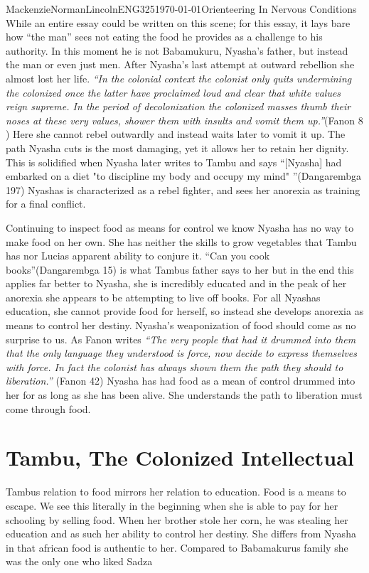 \documentclass{article}
\begin{document}
\begin{mla}{Mackenzie}{Norman}{Lincoln}{ENG325}{\today}{Orienteering In Nervous Conditions}
While an entire essay could be written on this scene; for this essay, it lays bare how ``the man'' sees not eating the food he provides as a challenge to his authority. In this moment he is not Babamukuru, Nyasha's father, but instead the man or even just men. After Nyasha's last attempt at outward rebellion she almost lost her life. \textit{``In the colonial context the colonist only quits undermining the colonized once the latter have proclaimed loud and clear that white values reign supreme. In the period of decolonization the colonized masses thumb their noses at these very values, shower them with insults and vomit them up.''}(Fanon 8 ) Here she cannot rebel outwardly and instead waits later to vomit it up. The path Nyasha cuts is the most damaging, yet it allows her to retain her dignity. This is solidified when Nyasha later writes to Tambu and says ``[Nyasha] had embarked on a diet "to discipline my body and occupy my mind" ''(Dangarembga 197) Nyashas is characterized as a rebel fighter, and sees her anorexia as training for a final conflict. 

Continuing to inspect food as means for control we know Nyasha has no way to make food on her own. She has neither the skills to grow vegetables that Tambu has nor Lucias apparent ability to conjure it. ``Can you cook books''(Dangarembga 15) is what Tambus father says to her but in the end this applies far better to Nyasha, she is incredibly educated and in the peak of her anorexia she appears to be attempting to live off books. For all Nyashas education, she cannot provide food for herself, so instead she develops anorexia as means to control her destiny. Nyasha's weaponization of food should come as no surprise to us. As Fanon writes \textit{``The very people that had it drummed into them that the only language they understood is force, now decide to express themselves with force. In fact the colonist has always shown them the path they should to liberation.''} (Fanon 42) Nyasha has had food as a mean of control drummed into her for as long as she has been alive. She understands the path to liberation must come through food. 


\section*{ Tambu, The Colonized Intellectual}
Tambus relation to food mirrors her relation to education. Food is a means to escape. We see this literally in the beginning when she is able to pay for her schooling by selling food. When her brother stole her corn, he was stealing her education and as such her ability to control her destiny. She differs from Nyasha in that african food is authentic to her. Compared to Babamakurus family she was the only one who liked Sadza 


\end{mla}
\end{document}
